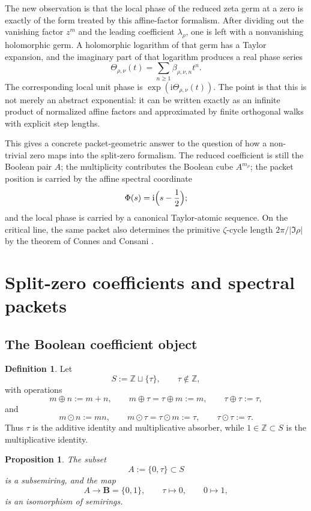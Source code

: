 \documentclass[11pt,a4paper]{article}
\numberwithin{equation}{section}
\newtheorem{proposition}[theorem]{Proposition}
\theoremstyle{definition}
\newtheorem{definition}[theorem]{Definition}
\theoremstyle{remark}
\newcommand{\ZZ}{\mathbb Z}
\newcommand{\BB}{\mathbf B}
\newcommand{\taup}{\tau}
\newcommand{\ii}{\mathrm i}
\begin{document}
The new observation is that the local phase of the reduced zeta germ at a zero is exactly of the form treated by this affine-factor formalism.  After dividing out the vanishing factor $z^m$ and the leading coefficient $\lambda_\rho$, one is left with a nonvanishing holomorphic germ.  A holomorphic logarithm of that germ has a Taylor expansion, and the imaginary part of that logarithm produces a real phase series
\[
\Theta_{\rho,\nu}(t)=\sum_{n\ge 1}\beta_{\rho,\nu,n}t^n.
\]
The corresponding local unit phase is $\exp(\ii\Theta_{\rho,\nu}(t))$.  The point is that this is not merely an abstract exponential: it can be written exactly as an infinite product of normalized affine factors and approximated by finite orthogonal walks with explicit step lengths.

This gives a concrete packet-geometric answer to the question of how a non-trivial zero maps into the split-zero formalism.  The reduced coefficient is still the Boolean pair $A$; the multiplicity contributes the Boolean cube $A^{m_\rho}$; the packet position is carried by the affine spectral coordinate
\[
\Phi(s)=\ii\Bigl(s-\frac12\Bigr);
\]
and the local phase is carried by a canonical Taylor-atomic sequence.  On the critical line, the same packet also determines the primitive $\zeta$-cycle length $2\pi/|\Im\rho|$ by the theorem of Connes and Consani \cite{ConnesConsaniCycles}.

\section{Split-zero coefficients and spectral packets}

\subsection{The Boolean coefficient object}

\begin{definition}
Let
\[
S:=\ZZ\sqcup\{\taup\},\qquad \taup\notin\ZZ,
\]
with operations
\[
m\oplus n:=m+n,
\qquad
m\oplus \taup=\taup\oplus m:=m,
\qquad
\taup\oplus\taup:=\taup,
\]
and
\[
m\odot n:=mn,
\qquad
m\odot\taup=\taup\odot m:=\taup,
\qquad
\taup\odot\taup:=\taup.
\]
Thus $\taup$ is the additive identity and multiplicative absorber, while $1\in\ZZ\subset S$ is the multiplicative identity.
\end{definition}

\begin{proposition}\label{P4:prop:boolean-pair}
The subset
\[
A:=\{0,\taup\}\subset S
\]
is a subsemiring, and the map
\[
A\longrightarrow \BB=\{0,1\},\qquad \taup\mapsto 0,\qquad 0\mapsto 1,
\]
is an isomorphism of semirings.
\end{proposition}
\end{document}
